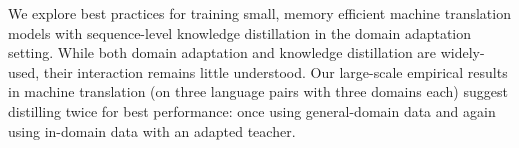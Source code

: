 We explore best practices for training small, memory efficient machine translation models with sequence-level knowledge distillation in the domain adaptation setting. While both domain adaptation and knowledge distillation are widely-used, their interaction remains little understood. Our large-scale empirical results in machine translation (on three language pairs with three domains each) suggest distilling twice for best performance: once using general-domain data and again using in-domain data with an adapted teacher.
